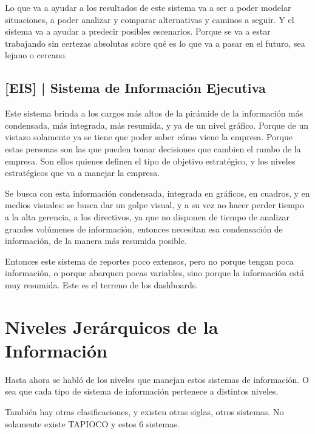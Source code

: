 Lo que va a ayudar a los resultados de este sistema va a ser a poder
modelar situaciones, a poder analizar y comparar alternativas y caminos
a seguir. Y el sistema va a ayudar a predecir posibles escenarios.
Porque se va a estar trabajando sin certezas absolutas sobre qué es lo
que va a pasar en el futuro, sea lejano o cercano.

\hypertarget{sistema-de-informaciuxf3n-ejecutiva}{%
\subsection{%
{[}EIS{]} |
Sistema de Información Ejecutiva
}\label{sistema-de-informaciuxf3n-ejecutiva}}

Este sistema brinda a los cargos más altos de la pirámide de la
información más condensada, más integrada, más resumida, y ya de un
nivel gráfico. Porque de un vistazo solamente ya se tiene que poder
saber cómo viene la empresa. Porque estas personas son las que pueden
tomar decisiones que cambien el rumbo de la empresa. Son ellos quienes
definen el tipo de objetivo estratégico, y los niveles estratégicos que
va a manejar la empresa.

Se busca con esta información condensada, integrada en gráficos, en
cuadros, y en medios visuales: se busca dar un golpe visual, y a su vez
no hacer perder tiempo a la alta gerencia, a los directivos, ya que no
disponen de tiempo de analizar grandes volúmenes de información,
entonces necesitan esa condensación de información, de la manera más
resumida posible.

Entonces este sistema de reportes poco extensos, pero no porque tengan
poca información, o porque abarquen pocas variables, sino porque la
información está muy resumida. Este es el terreno de los dashboards.


\hypertarget{niveles-jeruxe1rquicos-de-la-informaciuxf3n}{%
\section{Niveles Jerárquicos de la
Información}\label{niveles-jeruxe1rquicos-de-la-informaciuxf3n}}

Hasta ahora se habló de los niveles que manejan estos sistemas de
información. O sea que cada tipo de sistema de información pertenece a
distintos niveles.

También hay otras clasificaciones, y existen otras siglas, otros
sistemas. No solamente existe TAPIOCO y estos 6 sistemas.

